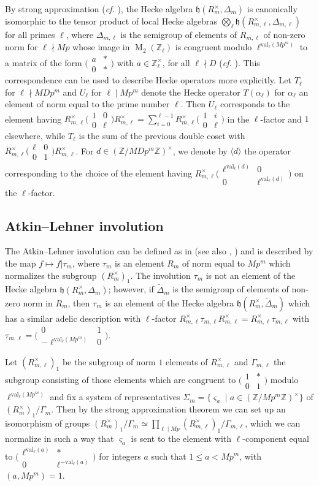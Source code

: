 \documentclass[a4paper,11pt]{amsart}
\numberwithin{equation}{section}
\theoremstyle{plain}
\theoremstyle{definition}
\theoremstyle{remark}
\newcommand{\Z}{\mathbb{Z}}
\DeclareMathOperator{\M}{M}
\newcommand{\val}{\mathrm{val}}
\newcommand{\smallmat}[4]{\bigl(\begin{smallmatrix}#1&#2\\#3&#4\end{smallmatrix}\bigr)}
\begin{document}
By strong approximation (\emph{cf.} \cite[Theorem 5.2.10]{Miyake}), the Hecke algebra $\mathfrak{h}(R_{m}^\times,\Delta_{m})$ is canonically isomorphic to the tensor product of local Hecke algebras $\bigotimes_\ell \mathfrak{h}(R_{m,\ell}^\times,\Delta_{m,\ell})$ for all primes $\ell$, where $\Delta_{m,\ell}$ is the semigroup of elements of $R_{m,\ell}$ of non-zero norm for $\ell\nmid Mp$ whose image in $\M_2(\Z_\ell)$ is congruent modulo $\ell^{\val_\ell(Mp^m)}$ to a matrix of the form $\smallmat a{*}0{*}$ with $a\in\Z_\ell^\times$, for all $\ell\nmid D$ (\emph{cf.} \cite[Theorem 5.3.5]{Miyake}). This correspondence can be used to describe Hecke operators more explicitly. Let $T_\ell$ for $\ell\nmid MDp^m$ and $U_\ell$ for $\ell\mid Mp^m$ denote the Hecke operator $T(\alpha_\ell)$ for $\alpha_\ell$ an element of norm equal to the prime number $\ell$. Then $U_\ell$ corresponds to the element having $R_{m,\ell}^\times\smallmat 100\ell R_{m,\ell}^\times=\sum_{i=0}^{\ell-1}R_{m,\ell}^\times\smallmat 1i0\ell$ in the $\ell$-factor and $1$ elsewhere, while $T_\ell$ is the sum of the previous double coset with $R_{m,\ell}^\times\smallmat \ell001R_{m,\ell}^\times$.
For $d\in (\Z/MDp^m\Z)^\times$, we denote by $\langle d\rangle$ the operator corresponding to the choice of the element having $R_{m,\ell}^\times\smallmat{\ell^{\val_\ell(d)}}{0}{0}{\ell^{\val_\ell(d)}}$ on the $\ell$-factor.

\subsection{Atkin--Lehner involution}\label{sectionAL} 
The Atkin--Lehner involution can be defined as in \cite[\S3.3]{Ogg} (see also \cite[Section 1]{dVP}, \cite[\S2.2]{LRV}) and is described by the map $f\mapsto f|\tau_m$, where $\tau_m$ is an element $R_m$ of norm equal to $Mp^m$ which normalizes the subgroup $(R_m^\times)_1$. The involution $\tau_m$ is not an element of the Hecke algebra $\mathfrak{h}(R_m^\times,\Delta_m)$; however, if $\widetilde\Delta_m$ is the semigroup of elements of non-zero norm in $R_{m}$, then $\tau_m$ is an element of the Hecke algebra $\mathfrak{h}(R_m^\times,\widetilde{\Delta}_m)$ which has a similar adelic description with $\ell$-factor $R_{m,\ell}^\times\tau_{m,\ell}R_{m,\ell}^\times=R_{m,\ell}^\times\tau_{m,\ell}$ with $\tau_{m,\ell}=\smallmat 01{-\ell^{\val_\ell(Mp^m)}}0$.

Let $(R^\times_{m,\ell})_1$ be the subgroup of norm $1$ elements of $R_{m,\ell}^\times$ and ${\Gamma}_{m,\ell}$ the subgroup consisting of those elements which are congruent to $\smallmat 1*01$ modulo $\ell^{\val_\ell(Mp^m)}$ and fix a system of representatives $\Sigma_m=\{\varsigma_a\mid a\in(\Z/Mp^m\Z)^\times\}$ of $(R^\times_m)_1/\Gamma_m$. Then by the strong approximation theorem we can set up an isomorphism of groups $(R^\times_m)_1/\Gamma_m\simeq \prod_{\ell\mid Mp}(R^\times_{m,\ell})_1/{\Gamma}_{m,\ell}$, which we can normalize in such a way that $\varsigma_a$ is sent to the element with $\ell$-component equal to $\smallmat {\ell^{\val_\ell(a)}}{*}{0}{\ell^{-\val_\ell(a)}}$ for integers $a$ such that $1\leq a<Mp^{m}$, with $(a,Mp^m)=1$. 
\end{document}
